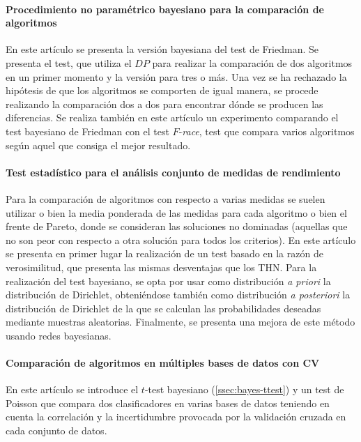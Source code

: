 \paragraph{Procedimiento no paramétrico bayesiano para la 
comparación de algoritmos} \cite{DBLP:conf/icml/BenavoliCMZ15} En este 
artículo se presenta la versión bayesiana del test de 
Friedman. Se presenta el test, que utiliza el $DP$ para 
realizar la comparación de dos algoritmos en un primer
momento y la versión para tres o más. Una vez se ha rechazado 
la hipótesis de que los algoritmos se comporten de igual
manera, se procede realizando la comparación dos a dos 
para encontrar dónde se producen las diferencias. Se realiza 
también en este artículo un experimento comparando el test
bayesiano de Friedman con el test $F$-\textit{race}, test que
compara varios algoritmos según aquel que consiga el mejor
resultado.

\paragraph{Test estadístico para el análisis conjunto de 
medidas de rendimiento} \cite{DBLP:conf/jsai/BenavoliC15}	Para la 
comparación de algoritmos con respecto a varias medidas
se suelen utilizar o bien la media ponderada de las medidas
para cada algoritmo o bien el frente de Pareto, donde se 
consideran las soluciones no dominadas (aquellas que no son
peor con respecto a otra solución para todos los criterios).
En este artículo se presenta en primer lugar la realización 
de un test basado en la razón de verosimilitud, que presenta
las mismas desventajas que los THN. Para la realización del
test bayesiano, se opta por usar como distribución 
\textit{a priori} la distribución de Dirichlet, obteniéndose
también como distribución \textit{a posteriori} la 
distribución de Dirichlet de la que se calculan las 
probabilidades deseadas mediante muestras aleatorias.
Finalmente, se presenta una mejora de este método usando
redes bayesianas.

\paragraph{Comparación de algoritmos en múltiples bases de 
datos con CV} \cite{DBLP:journals/ml/CoraniB15} En este artículo se introduce
el $t$-test bayesiano (\ref{ssec:bayes-ttest}) y un test de 
Poisson que compara dos clasificadores en varias bases de 
datos teniendo en cuenta la correlación y la incertidumbre 
provocada por la validación cruzada en cada conjunto de 
datos.

